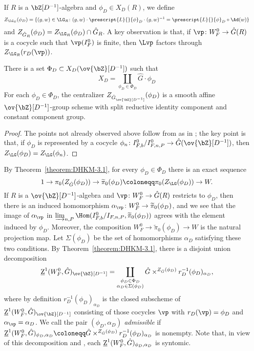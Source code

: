 If $R$ is a $\bZ[D^{-1}]$-algebra and $\phi_D \in X_D(R)$, we define
\[
Z_{\LG_R}(\phi_D) = \{(g, w) \in \LG_R\colon (g, w)\cdot \prescript{L}{}{\phi}_D \cdot (g, w)^{-1} = \prescript{L}{}{\phi}_D \circ \Ad(w)\}
\]
and $Z_{\hat{G}_R}(\phi_D) = Z_{\LG_R}(\phi_D) \cap \hat{G}_R$. A key observation is that, if $\vp\colon W_F^0 \to \hat{G}(R)$ is a cocycle such that $\vp(I_F^0)$ is finite, then $\Lvp$ factors through $Z_{\LG_R}(r_D(\vp))$.

\begin{theorem}\label{theorem:DHKM-3.1}
    There is a set $\Phi_D \subset X_D(\ov{\bZ}[D^{-1}])$ such that
    \[
    X_D = \coprod_{\phi_D \in \Phi_D} \hat{G} \cdot \phi_D
    \]
    For each $\phi_D \in \Phi_D$, the centralizer $Z_{\hat{G}_{\ov{\bZ}[D^{-1}]}}(\phi_D)$ is a smooth affine $\ov{\bZ}[D^{-1}]$-group scheme with split reductive identity component and constant component group.
\end{theorem}

\begin{proof}
    The points not already observed above follow from \cite[A.12, A.13]{DHKM} as in \cite[3.1]{DHKM}; the key point is that, if $\phi_D$ is represented by a cocycle $\phi_n\colon I_{F, b}^0/I_{F, n, P}^0 \to \hat{G}(\ov{\bZ}[D^{-1}])$, then $Z_{\LG}(\phi_D) = Z_{\LG}(\phi_n)$.
\end{proof}

By Theorem~\ref{theorem:DHKM-3.1}, for every $\phi_D \in \Phi_D$ there is an exact sequence
\[
1 \to \pi_0(Z_{\hat{G}}(\phi_D)) \to \widetilde{\pi}_0(\phi_D) \coloneqq \pi_0(Z_{\LG}(\phi_D)) \to W.
\]
If $R$ is a $\ov{\bZ}[D^{-1}]$-algebra and $\vp\colon W_F^0 \to \hat{G}(R)$ restricts to $\phi_D$, then there is an induced homomorphism $\alpha_{\vp}\colon W_F^0 \to \widetilde{\pi}_0(\phi_D)$, and we see that the image of $\alpha_{\vp}$ in $\varinjlim_{n, P} \Hom(I_{F, b}^0/I_{F,n,P}, \widetilde{\pi}_0(\phi_D))$ agrees with the element induced by $\phi_D$. Moreover, the composition $W_F^0 \to \widetilde{\pi}_0(\phi_D) \to W$ is the natural projection map. Let $\Sigma(\phi_D)$ be the set of homomorphisms $\alpha_D$ satisfying these two conditions. By Theorem~\ref{theorem:DHKM-3.1}, there is a disjoint union decomposition
\[
\underline{\rm{Z}}^1(W_F^0, \hat{G})_{\ov{\bZ}[D^{-1}]} = \coprod_{\substack{
    \phi_D \in \Phi_D \\
    \alpha_D \in \Sigma(\phi_D)}} \hat{G} \times^{Z_{\hat{G}}(\phi_D)} r_D^{-1}(\phi_D)_{\alpha_D},
\]
where by definition $r_D^{-1}(\phi_D)_{\alpha_D}$ is the closed subscheme of $\underline{\rm{Z}}^1(W_F^0, \hat{G})_{\ov{\bZ}[D^{-1}]}$ consisting of those cocycles $\vp$ with $r_D(\vp) = \phi_D$ and $\alpha_{\vp} = \alpha_D$. We call the pair $(\phi_D, \alpha_D)$ \textit{admissible} if $\underline{\rm{Z}}^1(W_F^0, \hat{G})_{\phi_D, \alpha_D} \coloneqq \hat{G} \times^{Z_{\hat{G}}(\phi_D)} r_D^{-1}(\phi_D)_{\alpha_D}$ is nonempty. Note that, in view of this decomposition and \cite[4.1]{DHKM}, each $\underline{\rm{Z}}^1(W_F^0, \hat{G})_{\phi_D, \alpha_D}$ is syntomic.\smallskip

